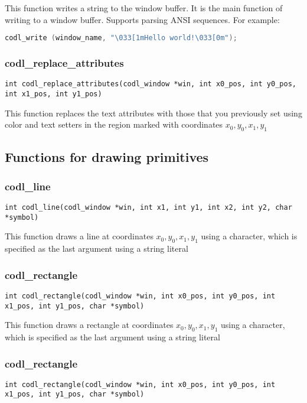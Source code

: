 \documentclass{article}
\newcommand{\fstep}{\vspace{3mm}\noindent}
\begin{document}
\fstep{} This function writes a string to the window buffer.
It is the main function of writing to a window buffer. Supports parsing ANSI
sequences. For example:
\begin{lstlisting}[language=C]
codl_write (window_name, "\033[1mHello world!\033[0m");
\end{lstlisting}

\subsubsection{codl\_replace\_attributes}
{\tt int codl\_replace\_attributes(codl\_window *win, int x0\_pos, int y0\_pos,
                int x1\_pos, int y1\_pos)}

\fstep{} This function replaces the text attributes with those that you
previously set using color and text setters in the region marked with
coordinates $x_0, y_0, x_1, y_1$

\subsection{Functions for drawing primitives}
\subsubsection{codl\_line}
{\tt int codl\_line(codl\_window *win, int x1, int y1, int x2, int y2,
                char *symbol)}

\fstep{} This function draws a line at coordinates $x_0, y_0, x_1, y_1$ using a
character, which is specified as the last argument using a string literal

\subsubsection{codl\_rectangle}
{\tt int codl\_rectangle(codl\_window *win, int x0\_pos, int y0\_pos,
                int x1\_pos, int y1\_pos, char *symbol)}

\fstep{} This function draws a rectangle at coordinates $x_0, y_0, x_1, y_1$ using a
character, which is specified as the last argument using a string literal

\subsubsection{codl\_rectangle}
{\tt int codl\_rectangle(codl\_window *win, int x0\_pos, int y0\_pos,
                int x1\_pos, int y1\_pos, char *symbol)}
\end{document}
